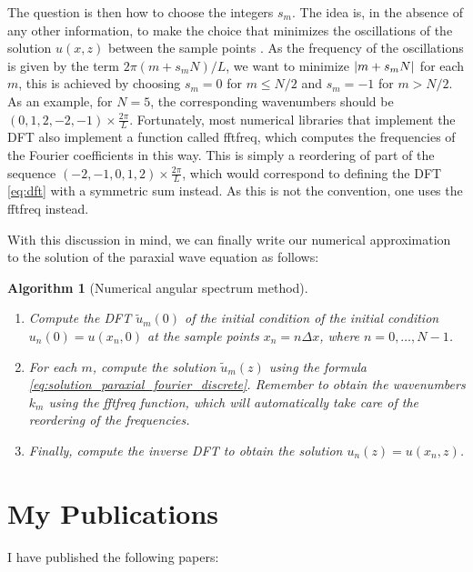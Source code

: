 \documentclass[a4paper,10pt]{report}
\newtheorem{alg}{Algorithm}
\begin{document}
The question is then how to choose the integers $s_m$. The idea is, in the absence of any other information, to make the choice that minimizes the oscillations of the solution $u(x,z)$ between the sample points \cite{fftderiv}. As the frequency of the oscillations is given by the term $2\pi (m + s_m N) / L$, we want to minimize $\abs{m + s_m N}$ for each $m$, this is achieved by choosing $s_m = 0$ for $m \le N/2$ and $s_m = -1$ for $m > N/2$. As an example, for $N = 5$, the corresponding wavenumbers should be $(0, 1, 2, -2, -1) \times \frac{2\pi}{L}$. Fortunately, most numerical libraries that implement the DFT also implement a function called fftfreq, which computes the frequencies of the Fourier coefficients in this way. This is simply a reordering of part of the sequence $(-2, -1, 0, 1, 2) \times \frac{2\pi}{L}$, which would correspond to defining the DFT \eqref{eq:dft} with a symmetric sum instead. As this is not the convention, one uses the fftfreq instead. 

With this discussion in mind, we can finally write our numerical approximation to the solution of the paraxial wave equation as follows:
\begin{alg}[Numerical angular spectrum method]
\leavevmode
\begin{enumerate}
    \item Compute the DFT $\tilde{u}_m(0)$ of the initial condition of the initial condition $u_n(0) = u(x_n,0)$ at the sample points $x_n = n \Delta x$, where $n = 0, \ldots, N-1$.
    \item For each $m$, compute the solution $\tilde{u}_m(z)$ using the formula \eqref{eq:solution_paraxial_fourier_discrete}. Remember to obtain the wavenumbers $k_m$ using the fftfreq function, which will automatically take care of the reordering of the frequencies.
    \item Finally, compute the inverse DFT to obtain the solution $u_n(z) = u(x_n,z)$.
\end{enumerate}
\end{alg}

\chapter{My Publications}

I have published the following papers: \cite{PhysRevA.108.013503, DEOLIVEIRA2024110983, 48bj-bm8b}



\end{document}
